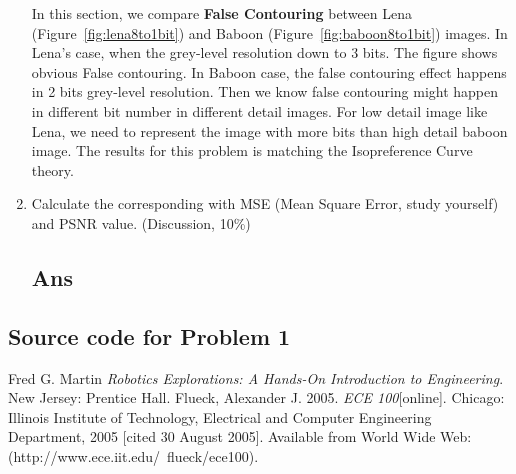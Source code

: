 \documentclass[a4paper, 11pt]{article}
\begin{document}
\begin{enumerate}[label=\alph*.]
\begin{figure}[h]
  \end{figure}
  \newpage
  In this section, we compare \textbf{False Contouring} between Lena 
  (Figure~\ref{fig:lena8to1bit}) and Baboon (Figure~\ref{fig:baboon8to1bit}) images. 
  In Lena's case, when the grey-level resolution down to 3 bits. The figure shows obvious 
  False contouring. In Baboon case, the false contouring effect happens in 2 bits grey-level 
  resolution. Then we know false contouring might happen in different bit number in different
  detail images. For low detail image like Lena, we need to represent the image with more 
  bits than high detail baboon image. The results for this problem is matching the 
  Isopreference Curve theory.
  \item Calculate the corresponding with MSE (Mean Square Error, study yourself) and PSNR value.
  (Discussion, 10\%)
  \subsection*{Ans}
\end{enumerate}
\subsection*{Source code for Problem 1}


    
\begin{thebibliography}{9}
	 Fred G. Martin \emph{Robotics Explorations: A Hands-On Introduction to Engineering}. New Jersey: Prentice Hall.
	  Flueck, Alexander J. 2005. \emph{ECE 100}[online]. Chicago: Illinois Institute of Technology, Electrical and Computer Engineering Department, 2005 [cited 30
	August 2005]. Available from World Wide Web: (http://www.ece.iit.edu/~flueck/ece100).
\end{thebibliography}
    
\end{document}
